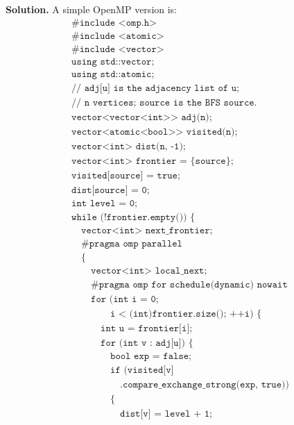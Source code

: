 \begin{ppexercises}
\begin{ppexercise}
{\textbf{Solution.}
A simple OpenMP version is:
\[
\begin{array}{l}
\texttt{\#include <omp.h>} \\
\texttt{\#include <atomic>} \\
\texttt{\#include <vector>} \\[2pt]
\texttt{using std::vector;} \\
\texttt{using std::atomic;} \\[2pt]
\texttt{// adj[u] is the adjacency list of u;} \\
\texttt{// n vertices; source is the BFS source.} \\
\texttt{vector<vector<int>> adj(n);} \\
\texttt{vector<atomic<bool>> visited(n);} \\
\texttt{vector<int> dist(n, -1);} \\
\texttt{vector<int> frontier = \{source\};} \\[2pt]
\texttt{visited[source] = true;} \\
\texttt{dist[source] = 0;} \\
\texttt{int level = 0;} \\[2pt]
\texttt{while (!frontier.empty()) \{} \\
\quad \texttt{vector<int> next\_frontier;} \\
\quad \texttt{\#pragma omp parallel} \\
\quad \texttt{\{} \\
\quad\quad \texttt{vector<int> local\_next;} \\
\quad\quad \texttt{\#pragma omp for schedule(dynamic) nowait} \\
\quad\quad \texttt{for (int i = 0;} \\
\quad\quad\quad\quad \texttt{i < (int)frontier.size(); ++i) \{} \\
\quad\quad\quad \texttt{int u = frontier[i];} \\
\quad\quad\quad \texttt{for (int v : adj[u]) \{} \\
\quad\quad\quad\quad \texttt{bool exp = false;} \\
\quad\quad\quad\quad \texttt{if (visited[v]} \\
\quad\quad\quad\quad\quad \texttt{.compare\_exchange\_strong(exp, true))} \\
\quad\quad\quad\quad \texttt{\{} \\
\quad\quad\quad\quad\quad \texttt{dist[v] = level + 1;} \\

\end{array}
\]
\newpage

}
\end{ppexercise}
\end{ppexercises}
